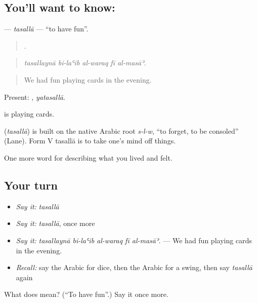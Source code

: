 \subsection*{You'll want to know: }
\textbf{} — \emph{tasallā} — \textquotedblleft{}to have fun\textquotedblright{}.

\begin{quote}
    .
\end{quote}

\begin{quote}
\emph{tasallaynā bi-laʿib al-waraq fī al-masāʾ.}
\end{quote}

\begin{quote}
We had fun playing cards in the evening.
\end{quote}

Present: , \emph{yatasallā}.

  is playing cards.

\begin{cousinweb}
\textbf{} (\emph{tasallā}) is built on the native Arabic root \emph{s-l-w}, \textquotedblleft{}to forget, to be consoled\textquotedblright{} (Lane). Form V tasallā is to take one's mind off things.
\end{cousinweb}

\begin{grammarlens}[title={What you've built}]
One more word for describing what you lived and felt.
\end{grammarlens}

\subsection*{Your turn}
\begin{itemize}
\raggedright
  \item \emph{Say it:} \emph{tasallā}
  \item \emph{Say it:} \emph{tasallā}, once more
  \item \emph{Say it:} \emph{tasallaynā bi-laʿib al-waraq fī al-masāʾ.} — We had fun playing cards in the evening.
  \item \emph{Recall:} say the Arabic for dice, then the Arabic for a swing, then say \emph{tasallā} again
\end{itemize}

\begin{tcolorbox}[breakable,colback=teal!4,colframe=teal!35!black,title={Before you move on}]
What does  mean? (\textquotedblleft{}To have fun\textquotedblright{}.) Say it once more.
\end{tcolorbox}
